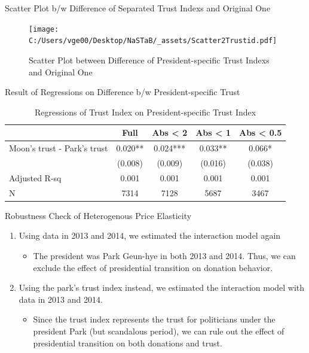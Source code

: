 \documentclass[
  ignorenonframetext,
]{beamer}
\providecommand{\tightlist}{%
  \setlength{\itemsep}{0pt}\setlength{\parskip}{0pt}}
\begin{document}
\begin{frame}{Scatter Plot b/w Difference of Separated Trust Indexs and
Original One}
\protect\hypertarget{scatter-plot-bw-difference-of-separated-trust-indexs-and-original-one}{}
\begin{figure}
\centering
\texttt{[image: C:/Users/vge00/Desktop/NaSTaB/\_assets/Scatter2Trustid.pdf]}
\caption{Scatter Plot between Difference of President-specific Trust
Indexs and Original One}
\end{figure}
\end{frame}

\begin{frame}{Result of Regressions on Difference b/w President-specific
Trust}
\protect\hypertarget{result-of-regressions-on-difference-bw-president-specific-trust}{}
\begin{table}

\caption{\label{tab:kableRegTrustidOnDiff2Trustid}Regressions of Trust Index on President-specific Trust Index}
\centering
\fontsize{9}{11}\selectfont
\begin{tabular}[t]{lcccc}
\toprule
 & Full & Abs < 2 & Abs < 1 & Abs < 0.5\\
\midrule
Moon's trust - Park's trust & 0.020** & 0.024*** & 0.033** & 0.066*\\
 & (0.008) & (0.009) & (0.016) & (0.038)\\
Adjusted R-sq & 0.001 & 0.001 & 0.001 & 0.001\\
N & 7314 & 7128 & 5687 & 3467\\
\bottomrule
\end{tabular}
\end{table}
\end{frame}

\begin{frame}{Robustness Check of Heterogenous Price Elasticity}
\protect\hypertarget{robustness-check-of-heterogenous-price-elasticity}{}
\begin{enumerate}
\tightlist
\item
  Using data in 2013 and 2014, we estimated the interaction model again

  \begin{itemize}
  \tightlist
  \item
    The president was Park Geun-hye in both 2013 and 2014. Thus, we can
    exclude the effect of presidential transition on donation behavior.
  \end{itemize}
\item
  Using the park's trust index instead, we estimated the interaction
  model with data in 2013 and 2014.

  \begin{itemize}
  \tightlist
  \item
    Since the trust index represents the trust for politicians under the
    president Park (but scandalous period), we can rule out the effect
    of presidential transition on both donations and trust.
  \end{itemize}
\end{enumerate}
\end{frame}
\end{document}
